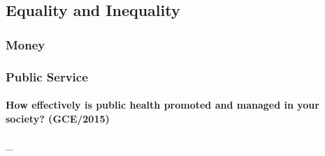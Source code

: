 \documentclass[../../main]{subfiles}
\begin{document}
\subsection{Equality and Inequality}

\subsubsection{Money}

\subsubsection{Public Service}

\paragraph{How effectively is public health promoted and managed in your society? (GCE/2015)} \_
\end{document}
